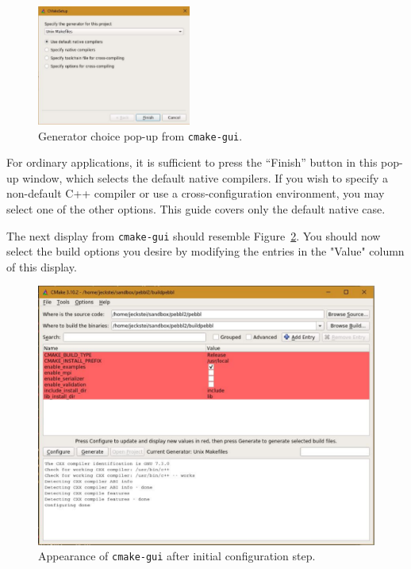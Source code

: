 \begin{figure}[tpb]
\begin{center}
\includegraphics[width=0.45\textwidth]{cmake-choosegen}
\vspace{-0.3in}
\end{center}
\caption{Generator choice pop-up from \texttt{cmake-gui}.\label{fig:cmake-choosegen}}
\end{figure}

For ordinary applications, it is sufficient to press the ``Finish'' button in
this pop-up window, which selects the default native compilers.  If you wish
to specify a non-default C++ compiler or use a cross-configuration
environment, you may select one of the other options.  This guide covers only
the default native case.

The next display from \texttt{cmake-gui} should resemble
Figure~\ref{fig:cmake2}.  You should now select the build options you desire
by modifying the entries in the "Value" column of this display.

\begin{figure}[tpb]
\begin{center}
\includegraphics[height=0.45\textheight]{cmake2}
\vspace{-0.3in}
\end{center}{}
\caption{Appearance of \texttt{cmake-gui} after initial configuration step.
  \label{fig:cmake2}}
\end{figure}

